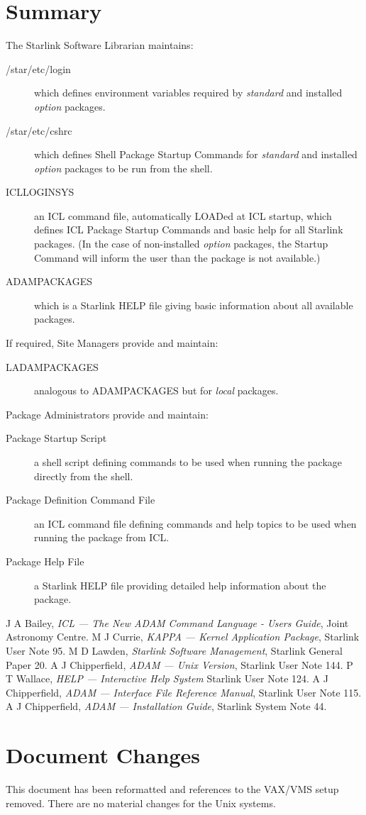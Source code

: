 \documentclass[twoside,11pt]{article}
\newcommand{\xlabel}[1]{}
\renewcommand{\_}{\texttt{\symbol{95}}}
\begin{document}
\normalsize

\section{\xlabel{summary}Summary}
The Starlink Software Librarian maintains:
\begin{description}
\item[/star/etc/login] which defines environment variables required by
\textit{standard} and installed \textit{option} packages.
\item[/star/etc/cshrc] which defines Shell Package Startup Commands for
\textit{standard} and installed \textit{option} packages to be run from the shell.
\item[ICL\_LOGIN\_SYS] an ICL command file, automatically LOADed at ICL startup,
which defines ICL Package Startup Commands and basic help for all Starlink
packages. (In the case of non-installed \textit{option} packages, the Startup
Command will inform the user than the package is not available.)
\item[ADAM\_PACKAGES] which is a Starlink HELP file giving basic information
about all available packages.
\end{description}
If required, Site Managers provide and maintain:
\begin{description}
\item[LADAM\_PACKAGES] analogous to ADAM\_PACKAGES but for \textit{local} packages.
\end{description}
Package Administrators provide and maintain:
\begin{description}
\item[Package Startup Script] a shell script defining commands to be used when
running the package directly from the shell.
\item[Package Definition Command File] an ICL command file defining commands
and help topics to be used when running the package from ICL.
\item[Package Help File] a Starlink HELP file providing detailed help
information about the package.
\end{description}

\begin{thebibliography}{9}
 J A Bailey, \textit{ICL --- The New ADAM Command Language - Users
Guide}, Joint Astronomy Centre.
 M J Currie, \textit{KAPPA --- Kernel Application Package},
Starlink User Note 95.
 M D Lawden, \textit{Starlink Software Management}, Starlink
General Paper 20.
 A J Chipperfield, \textit{ADAM --- Unix Version},
Starlink User Note 144.
 P T Wallace, \textit{HELP --- Interactive Help System}
Starlink User Note 124.
 A J Chipperfield, \textit{ADAM --- Interface File Reference Manual},
Starlink User Note 115.
 A J Chipperfield, \textit{ADAM --- Installation Guide}, Starlink
System Note 44.
\end{thebibliography}

\section{\xlabel{document_changes}Document Changes}
\label{changes}
This document has been reformatted and references to the VAX/VMS setup removed.
There are no material changes for the Unix systems.
\end{document}
